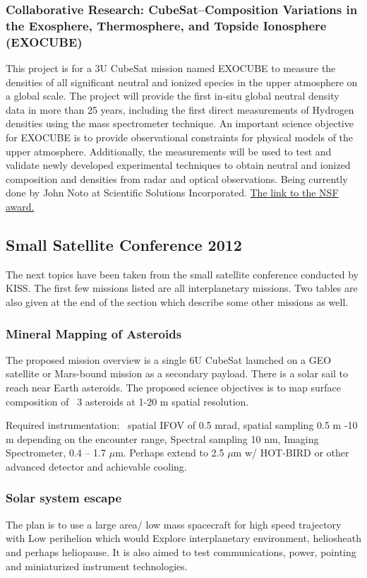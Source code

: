 \subsubsection{Collaborative Research: CubeSat--Composition Variations in the Exosphere, Thermosphere, and Topside Ionosphere (EXOCUBE)}

This project is for a 3U CubeSat mission named EXOCUBE to measure the densities of all significant neutral and ionized species in the upper atmosphere on a global scale. The project will provide the first in-situ global neutral density data in more than 25 years, including the first direct measurements of Hydrogen densities using the mass spectrometer technique. An important science objective for EXOCUBE is to provide observational constraints for physical models of the upper atmosphere. Additionally, the measurements will be used to test and validate newly developed experimental techniques to obtain neutral and ionized composition and densities from radar and optical observations. Being currently done by John Noto at Scientific Solutions Incorporated. \href{http://nsf.gov/awardsearch/showAward?AWD_ID=1042837&HistoricalAwards=false}{The link to the NSF award.}


\subsection{Small Satellite Conference 2012}
The next topics have been taken from the small satellite conference conducted by KISS. The first few missions listed are all interplanetary missions. Two tables are also given at the end of the section which describe some other missions as well. 

\subsubsection{Mineral Mapping of Asteroids}
The proposed mission overview is a single 6U CubeSat launched on a GEO satellite 
or Mars-bound mission as a secondary payload. There is a solar sail to reach near Earth asteroids. The proposed science objectives is to map surface composition of ~3 asteroids at 1-20 m spatial resolution.

Required instrumentation: ~spatial IFOV of 0.5 mrad, spatial sampling 0.5 m -10 m depending on the encounter range, Spectral sampling 10 nm, Imaging Spectrometer, 0.4 – 1.7 $\mu$m. Perhaps extend to 2.5 $\mu$m w/ HOT-BIRD or 
other advanced detector and achievable cooling. 

\subsubsection{Solar system escape}
The plan is to use a large area/ low mass spacecraft for high speed trajectory with Low perihelion which would Explore interplanetary environment, heliosheath and perhaps heliopause. It is also aimed to test communications, power, pointing and miniaturized instrument technologies.

